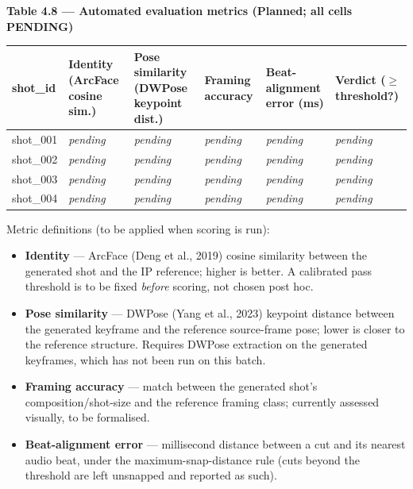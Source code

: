 \documentclass[10pt,twocolumn,letterpaper]{article}
\begin{document}
\begin{table}[t]
\centering
{\footnotesize\textbf{\textbf{Table 4.8 --- Automated evaluation metrics (Planned; all cells PENDING)}}}\par\vspace{3pt}
\scriptsize
\begin{tabularx}{\textwidth}{l>{\RaggedRight\arraybackslash}X>{\RaggedRight\arraybackslash}X>{\RaggedRight\arraybackslash}X>{\RaggedRight\arraybackslash}X>{\RaggedRight\arraybackslash}X}
\toprule
shot\_id & Identity (ArcFace cosine sim.) & Pose similarity (DWPose keypoint dist.) & Framing accuracy & Beat-alignment error (ms) & Verdict ($\ge$ threshold?) \\
\midrule
shot\_001 & \emph{pending} & \emph{pending} & \emph{pending} & \emph{pending} & \emph{pending} \\
shot\_002 & \emph{pending} & \emph{pending} & \emph{pending} & \emph{pending} & \emph{pending} \\
shot\_003 & \emph{pending} & \emph{pending} & \emph{pending} & \emph{pending} & \emph{pending} \\
shot\_004 & \emph{pending} & \emph{pending} & \emph{pending} & \emph{pending} & \emph{pending} \\
\bottomrule
\end{tabularx}
\end{table}

Metric definitions (to be applied when scoring is run):

\begin{itemize}[leftmargin=1.2em,itemsep=2pt,topsep=2pt]

\item \textbf{Identity} --- ArcFace (Deng et al., 2019) cosine similarity between the generated shot and the IP reference; higher is better. A calibrated pass threshold is to be fixed \emph{before} scoring, not chosen post hoc.

\item \textbf{Pose similarity} --- DWPose (Yang et al., 2023) keypoint distance between the generated keyframe and the reference source-frame pose; lower is closer to the reference structure. Requires DWPose extraction on the generated keyframes, which has not been run on this batch.

\item \textbf{Framing accuracy} --- match between the generated shot's composition/shot-size and the reference framing class; currently assessed visually, to be formalised.

\item \textbf{Beat-alignment error} --- millisecond distance between a cut and its nearest audio beat, under the maximum-snap-distance rule (cuts beyond the threshold are left unsnapped and reported as such).

\end{itemize}
\end{document}
